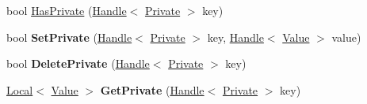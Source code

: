 \begin{DoxyCompactItemize}
\item 
bool \hyperlink{classv8_1_1Object_a5b6c320c5a31e2a3ddbd464835c8e9a7}{Has\-Private} (\hyperlink{classv8_1_1Handle}{Handle}$<$ \hyperlink{classv8_1_1Private}{Private} $>$ key)
\item 
\hypertarget{classv8_1_1Object_abb91701c8fbad34a4c0ccd3c7e18be28}{bool {\bfseries Set\-Private} (\hyperlink{classv8_1_1Handle}{Handle}$<$ \hyperlink{classv8_1_1Private}{Private} $>$ key, \hyperlink{classv8_1_1Handle}{Handle}$<$ \hyperlink{classv8_1_1Value}{Value} $>$ value)}\label{classv8_1_1Object_abb91701c8fbad34a4c0ccd3c7e18be28}

\item 
\hypertarget{classv8_1_1Object_a4751605ba0c560846832783efca46c71}{bool {\bfseries Delete\-Private} (\hyperlink{classv8_1_1Handle}{Handle}$<$ \hyperlink{classv8_1_1Private}{Private} $>$ key)}\label{classv8_1_1Object_a4751605ba0c560846832783efca46c71}

\item 
\hypertarget{classv8_1_1Object_a6d99ef0c7c505f1b7182f9fc11f373b0}{\hyperlink{classv8_1_1Local}{Local}$<$ \hyperlink{classv8_1_1Value}{Value} $>$ {\bfseries Get\-Private} (\hyperlink{classv8_1_1Handle}{Handle}$<$ \hyperlink{classv8_1_1Private}{Private} $>$ key)}\label{classv8_1_1Object_a6d99ef0c7c505f1b7182f9fc11f373b0}


\end{DoxyCompactItemize}
